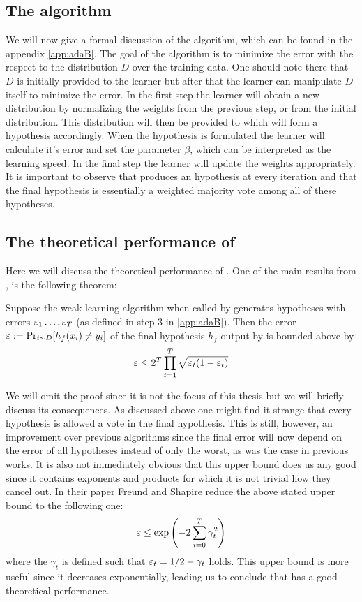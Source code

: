 \subsection{The algorithm}
\label{subsec:AdaAlgo}
We will now give a formal discussion of the \adaB\cite{Freund1997} algorithm, which can be found in the appendix \ref{app:adaB}. The goal of the algorithm is to minimize the error with the respect to the distribution $D$ over the training data. One should note there that $D$ is initially provided to the learner but after that the learner can manipulate $D$ itself to minimize the error. In the first step the learner will obtain a new distribution by normalizing the weights from the previous step, or from the initial distribution. This distribution will then be provided to \weak which will form a hypothesis accordingly. When the hypothesis is formulated the learner will calculate it's error and set the parameter $\beta$, which can be interpreted as the learning speed. In the final step the learner will update the weights appropriately. It is important to observe that \weak produces an hypothesis at every iteration and that the final hypothesis is essentially a weighted majority vote among all of these hypotheses. 


\subsection{The theoretical performance of \adaB}
\label{subsec:AdaTheoPerf}
Here we will discuss the theoretical performance of \adaB. One of the main results from \cite{Freund1997}, is the following theorem: 
\begin{theorem}\label{thm:adaErr}\cite{Freund1997}
Suppose the weak learning algorithm \weak when called by \adaB generates hypotheses with errors $\varepsilon_1\ldots, \varepsilon_T$ (as defined in step 3 in \ref{app:adaB}). Then the error \\$\varepsilon:=\Pr_{i\sim D}[h_f(x_i)\neq y_i]$ of the final hypothesis $h_f$ output by \adaB is bounded above by $$\varepsilon\leq 2^T\prod^T_{t=1}\sqrt{\varepsilon_t(1-\varepsilon_t)}$$
\end{theorem}
We will omit the proof since it is not the focus of this thesis but we will briefly discuss its consequences. As discussed above one might find it strange that every hypothesis is allowed a vote in the final hypothesis. This is still, however, an improvement over previous algorithms since the final error will now depend on the error of all hypotheses instead of only the worst, as was the case in previous works. It is also not immediately obvious that this upper bound does us any good since it contains exponents and products for which it is not trivial how they cancel out. In their paper Freund and Shapire reduce the above stated upper bound to the following one: $$\varepsilon\leq \exp\left(-2\sum^T_{i=0}\gamma_t^2\right)$$ where the $\gamma_t$ is defined such that $\varepsilon_t=1/2-\gamma_t$ holds. This upper bound is more useful since it decreases exponentially, leading us to conclude that \adaB has a good theoretical performance.   

